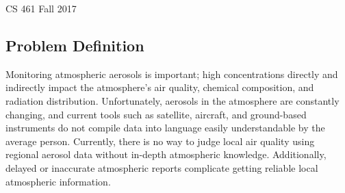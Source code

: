 \documentclass[letterpaper,10pt,draftclsnofoot,onecolumn]{IEEEtran}
\title{\team \assign}
\author{\name}
\def\course{CS 461 Fall 2017}
\begin{document}
\maketitle
\vspace*{10em}
\centering
\course
\vspace*{4em}

\begin{abstract} 
Atmospheric aerosols are particles suspended in the atmosphere. These particles originate from natural sources such as volcanic eruptions, and unnatural sources such fossil fuels combustion. One can visibly see the effects of aerosols in the 'Rayleigh scattering effect' of sunlight which visibly reddens sunsets and sunrises.
\end{abstract}

\clearpage
\begin{flushleft}
\section{Problem Definition}
Monitoring atmospheric aerosols is important; high concentrations directly and indirectly impact the atmosphere's air quality, chemical composition, and radiation distribution. Unfortunately, aerosols in the atmosphere are constantly changing, and current tools such as satellite, aircraft, and ground-based instruments do not compile data into language easily understandable by the average person. Currently, there is no way to judge local air quality using regional aerosol data without in-depth atmospheric knowledge. Additionally, delayed or inaccurate atmospheric reports complicate getting reliable local atmospheric information. 


\end{flushleft}
\end{document}

